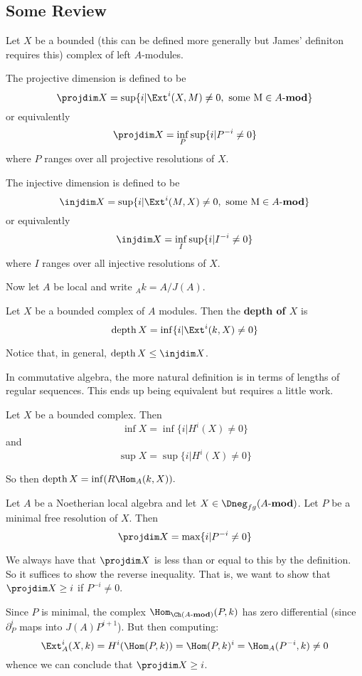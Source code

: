 \documentclass[12pt]{article}
\newcommand*{\Amod}{A\text{-}\mathbf{mod}}
\DeclareMathOperator{\depth}{depth}
\begin{document}
\subsection{Some Review}
Let $X$ be a bounded (this can be defined more generally but James' definiton requires this) complex of left $A$-modules.
\begin{defn}
	The projective dimension is defined to be 
	\[\projdim X=\sup\{i|\Ext^i(X,M)\ne 0,\text{ some M}\in\Amod\}\]
	or equivalently
	\[\projdim X=\inf_P\sup\{i|P^{-i}\ne 0\}\]
	where $P$ ranges over all projective resolutions of $X$.
\end{defn}
\begin{defn}
	The injective dimension is defined to be 
	\[\injdim X=\sup\{i|\Ext^i(M,X)\ne 0,\text{ some M}\in\Amod\}\]
	or equivalently
	\[\injdim X=\inf_I\sup\{i|I^{-i}\ne 0\}\]
	where $I$ ranges over all injective resolutions of $X$.
\end{defn}

Now let $A$ be local and write ${_A}k=A/J(A)$.
\begin{defn}
	Let $X$ be a bounded complex of $A$ modules. Then the \textbf{depth of $X$} is
	\[\operatorname{depth}X=\inf\{i|\Ext^i(k,X)\ne 0\}\]
\end{defn}
\begin{rmk}
	Notice that, in general, $\depth X\le \injdim X$.
\end{rmk}
\begin{rmk}
	In commutative algebra, the more natural definition is in terms of lengths of regular sequences. This ends up being 
	equivalent but requires a little work.
\end{rmk}
\begin{defn}
	Let $X$ be a bounded complex. Then 
	\[\inf X=\inf\{i|H^i(X)\ne 0\}\]
	and 
	\[\sup X=\sup\{i|H^i(X)\ne 0\}\]
\end{defn}
\begin{rmk}
	So then $\depth X=\inf(R\Hom_A(k,X)).$
\end{rmk}
\begin{lem}
	Let $A$ be a Noetherian local algebra and let $X\in\Dneg_{fg}(\Amod)$. Let $P$ be a minimal free resolution of $X$.
	Then 
	\[\projdim X=\max\{i|P^{-i}\ne 0\}\]
\end{lem}
\begin{prf}
	We always have that $\projdim X$ is less than or equal to this by the definition. So it suffices to show the reverse inequality.
	That is, we want to show that $\projdim X\ge i$ if $P^{-i}\ne 0.$

	Since $P$ is minimal, the complex $\Hom_{\Ch(\Amod)}(P,k)$ has zero differential (since $\partial_P^i$ maps into $J(A)P^{i+1}$).
	But then computing:
	\[\Ext_A^i(X,k)=H^i(\Hom(P,k))=\Hom(P,k)^i=\Hom_A(P^{-i},k)\ne 0\]
	whence we can conclude that $\projdim X\ge i$.
\end{prf}
\end{document}
